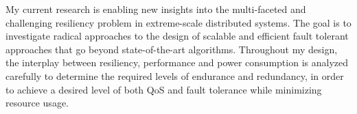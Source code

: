 
My current research is enabling new insights into the multi-faceted and challenging resiliency problem in extreme-scale distributed systems. The goal is to investigate radical approaches to the design of
scalable and  efficient fault tolerant approaches that go beyond state-of-the-art algorithms. Throughout my design, the interplay between resiliency, performance and power consumption is analyzed carefully to determine the required levels of
endurance and redundancy, in order to achieve a desired level of both QoS and fault tolerance while minimizing resource usage.


